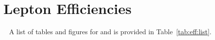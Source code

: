 \chapter{Lepton Efficiencies}~\label{ch:app:eff}
A list of tables and figures for \sg and \sh is provided in Table~\ref{tab:eff:list}.






